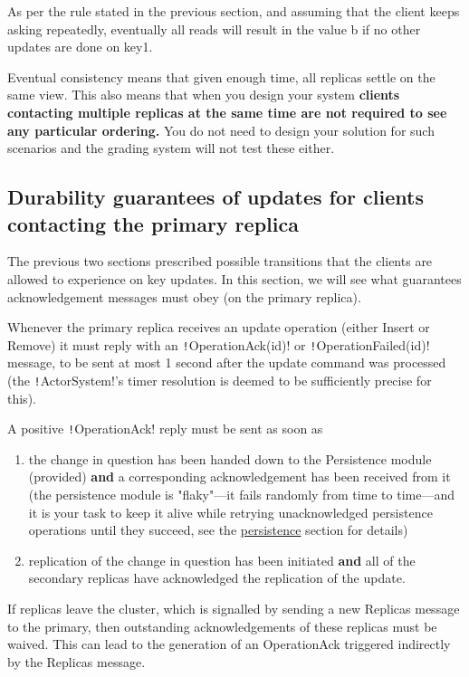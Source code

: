 \documentclass{article}
\begin{document}
As per the rule stated in the previous section, and assuming that the client keeps asking repeatedly, eventually all reads will result in the value b if no other updates are done on key1.

Eventual consistency means that given enough time, all replicas settle on the same view. This also means that when you design your system \textbf{clients contacting multiple replicas at the same time are not required to see any particular ordering.} You do not need to design your solution for such scenarios and the grading system will not test these either.

\subsection{Durability guarantees of updates for clients contacting the primary replica}

The previous two sections prescribed possible transitions that the clients are allowed to experience on key updates. In this section, we will see what guarantees acknowledgement messages must obey (on the primary replica).

Whenever the primary replica receives an update operation (either Insert or Remove) it must reply with an \texttt!OperationAck(id)! or \texttt!OperationFailed(id)! message, to be sent at most 1 second after the update command was processed (the \texttt!ActorSystem!’s timer resolution is deemed to be sufficiently precise for this).

A positive \texttt!OperationAck! reply must be sent as soon as

\begin{enumerate}
	\item the change in question has been handed down to the Persistence module (provided) \textbf{and} a corresponding acknowledgement has been received from it (the persistence module is "flaky"—it fails randomly from time to time—and it is your task to keep it alive while retrying unacknowledged persistence operations until they succeed, see the \hyperref[ss:persistence]{persistence} section for details)
	\item replication of the change in question has been initiated \textbf{and} all of the secondary replicas have acknowledged the replication of the update.
\end{enumerate}

If replicas leave the cluster, which is signalled by sending a new Replicas message to the primary, then outstanding acknowledgements of these replicas must be waived. This can lead to the generation of an OperationAck triggered indirectly by the Replicas message.
\end{document}
